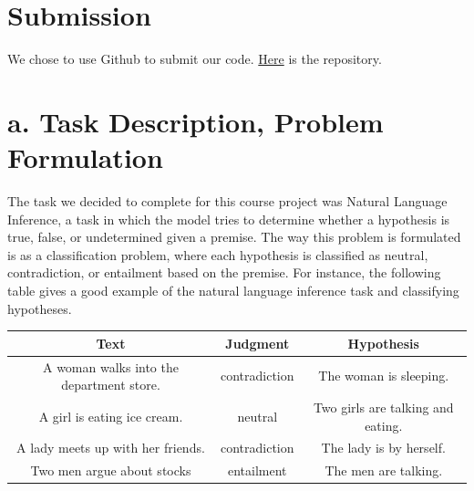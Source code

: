 \documentclass[12pt,letterpaper]{article}
\begin{document}
\section*{Submission} We chose to use Github to submit our code. \href{https://github.com/kathleen-xue/csci544project}{Here} is the repository.
\section*{a. Task Description, Problem Formulation}
The task we decided to complete for this course project was Natural Language Inference, a task in which the model tries to determine whether a hypothesis is true, false, or undetermined given a premise. The way this problem is formulated is as a classification problem, where each hypothesis is classified as neutral, contradiction, or entailment based on the premise. For instance, the following table gives a good example of the natural language inference task and classifying hypotheses.
\begin{center}
    \begin{tabular}{| c | c | c |}
        \hline
        \textbf{Text} & \textbf{Judgment} & \textbf{Hypothesis} \\ \hline
        A woman walks into the department store. & contradiction & The woman is sleeping.
        \\ \hline
        A girl is eating ice cream. & neutral & Two girls are talking and eating. \\ \hline
        A lady meets up with her friends. & contradiction & The lady is by herself. \\ \hline
        Two men argue about stocks & entailment & The men are talking. \\ \hline
    \end{tabular}
\end{center}
\end{document}
